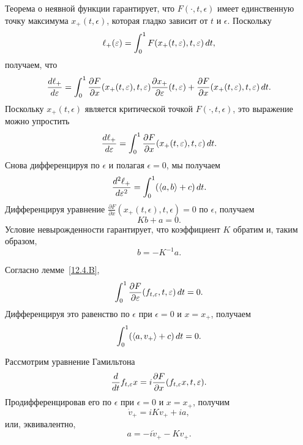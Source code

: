 Теорема о неявной функции гарантирует, что $F(\cdot, t, \epsilon)$ имеет единственную точку максимума $x_+(t, \epsilon)$, которая гладко зависит от $t$ и $\epsilon$.
Поскольку 
\[\ell_+(\varepsilon)=\int_0^1F(x_+(t,\varepsilon),t,\varepsilon)\,d t,\]
получаем, что
\[\frac{d \ell_+}{d \varepsilon}
=
\int_0^1
\frac{\partial F}{\partial x}(x_+(t,\varepsilon),t,\varepsilon)\frac{\partial x_+}{\partial \varepsilon}(t,\varepsilon)
+
\frac{\partial F}{\partial x}(x_+(t,\varepsilon),t,\varepsilon)\,d t.
\]
Поскольку $x_+(t,\epsilon)$ является критической точкой $F(\cdot,t,\epsilon)$, это выражение можно упростить
\[\frac{d \ell_+}{d \varepsilon}
=
\int_0^1
\frac{\partial F}{\partial x}(x_+(t,\varepsilon),t,\varepsilon)\,d t.
\]
Снова дифференцируя по $\epsilon$ и полагая $\epsilon = 0$, мы получаем 
\begin{equation}
\frac{d^2 \ell_+}{d\varepsilon^2}=\int_0^1 (\langle a, b\rangle +c)\,d t.
\label{eq:12.4.C}
\end{equation}
Дифференцируя уравнение 
$\frac{\partial F}{\partial x}(x_+ (t, \epsilon), t, \epsilon) = 0$ по
$\epsilon$, получаем 
\[Kb+a = 0.\]
Условие невырожденности гарантирует, что коэффициент $K$ обратим и,
таким образом,  
\begin{equation}
b=-K^{-1}a.
\label{eq:12.4.D}
\end{equation}

Согласно лемме~\ref{12.4.B}, 
\[\int_0^1\frac{\partial F}{\partial
  \varepsilon}(f_{t,\varepsilon},t,\varepsilon)\,d t=0.\] 
Дифференцируя это равенство по $\epsilon$ при $\epsilon = 0$ и $x =
x_+$, получаем  
\begin{equation}
\int_0^1(\langle a, v_+\rangle+c)\,d t = 0.
\label{eq:12.4.E}
\end{equation}

Рассмотрим уравнение Гамильтона
\[\frac{d}{d t}f_{t,\varepsilon}x=i\frac{\partial F}{\partial
  x}(f_{t,\varepsilon}x,t,\varepsilon).\] 
Продифференцировав его по $\epsilon$ при $\epsilon = 0$ и $x = x_+$,
получим
\[\dot v_+=iKv_++ia,\]
или, эквивалентно,
\begin{equation}
a=-i\dot v_+-Kv_+.
\label{eq:12.4.F}
\end{equation}

